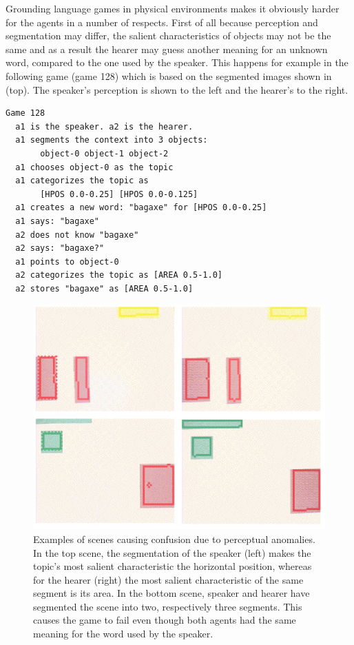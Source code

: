 Grounding language games in physical environments
makes it obviously harder
for the agents in a number of respects. First of 
all because perception and segmentation may differ, 
the salient characteristics of objects may not be the same
and as a result the hearer may guess another meaning for an 
unknown word, compared to 
the one used by the speaker. This happens for
example in the following game (game 128) which is based on 
the segmented images shown in  (top). The
speaker's perception is shown to the left and the 
hearer's to the right. 
\begin{verbatim}
Game 128
  a1 is the speaker. a2 is the hearer. 
  a1 segments the context into 3 objects: 
       object-0 object-1 object-2
  a1 chooses object-0 as the topic 
  a1 categorizes the topic as 
       [HPOS 0.0-0.25] [HPOS 0.0-0.125]
  a1 creates a new word: "bagaxe" for [HPOS 0.0-0.25]
  a1 says: "bagaxe"
  a2 does not know "bagaxe"
  a2 says: "bagaxe?"
  a1 points to object-0
  a2 categorizes the topic as [AREA 0.5-1.0]
  a2 stores "bagaxe" as [AREA 0.5-1.0]
\end{verbatim}

\begin{figure}
\begin{center}
\includegraphics[width=0.8\columnwidth]{chap7/figs/plate-16}
\end{center}
\caption{ Examples of scenes causing confusion
due to perceptual anomalies. In the top scene, 
the segmentation of the speaker (left) makes the 
topic's most salient characteristic the horizontal
position, whereas for the hearer (right) the most salient
characteristic of the same segment is its area. In the 
bottom scene, speaker and hearer have segmented the 
scene into two, respectively three segments. This 
causes the game to fail even though both agents 
had the same meaning for the word used by the speaker.}
\label{fig:plate-16}
\end{figure}

